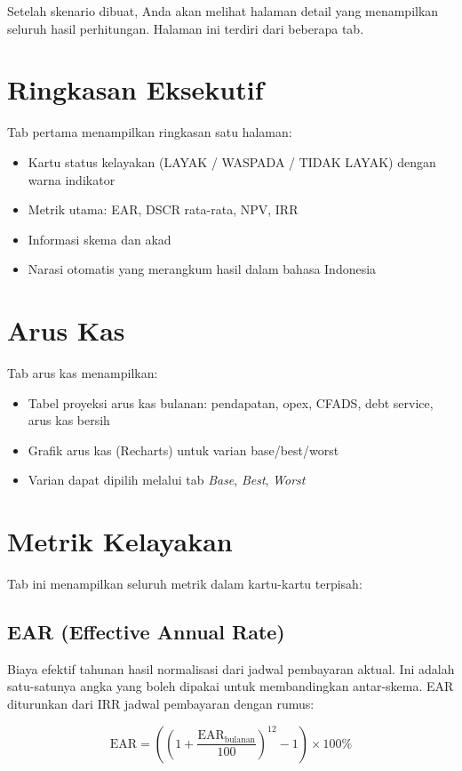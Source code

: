 \documentclass[12pt,a4paper,twoside]{report}
\begin{document}
Setelah skenario dibuat, Anda akan melihat halaman detail yang menampilkan seluruh hasil perhitungan. Halaman ini terdiri dari beberapa tab.

\section{Ringkasan Eksekutif}

Tab pertama menampilkan ringkasan satu halaman:
\begin{itemize}
  \item Kartu status kelayakan (LAYAK / WASPADA / TIDAK LAYAK) dengan warna indikator
  \item Metrik utama: EAR, DSCR rata-rata, NPV, IRR
  \item Informasi skema dan akad
  \item Narasi otomatis yang merangkum hasil dalam bahasa Indonesia
\end{itemize}

\section{Arus Kas}

Tab arus kas menampilkan:
\begin{itemize}
  \item Tabel proyeksi arus kas bulanan: pendapatan, opex, CFADS, debt service, arus kas bersih
  \item Grafik arus kas (Recharts) untuk varian base/best/worst
  \item Varian dapat dipilih melalui tab \emph{Base}, \emph{Best}, \emph{Worst}
\end{itemize}

\section{Metrik Kelayakan}

Tab ini menampilkan seluruh metrik dalam kartu-kartu terpisah:

\subsection{EAR (Effective Annual Rate)}

Biaya efektif tahunan hasil normalisasi dari jadwal pembayaran aktual. Ini adalah satu-satunya angka yang boleh dipakai untuk membandingkan antar-skema. EAR diturunkan dari IRR jadwal pembayaran dengan rumus:

\[
\text{EAR} = \left( \left(1 + \frac{\text{EAR}_{\text{bulanan}}}{100}\right)^{12} - 1 \right) \times 100\%
\]
\end{document}
